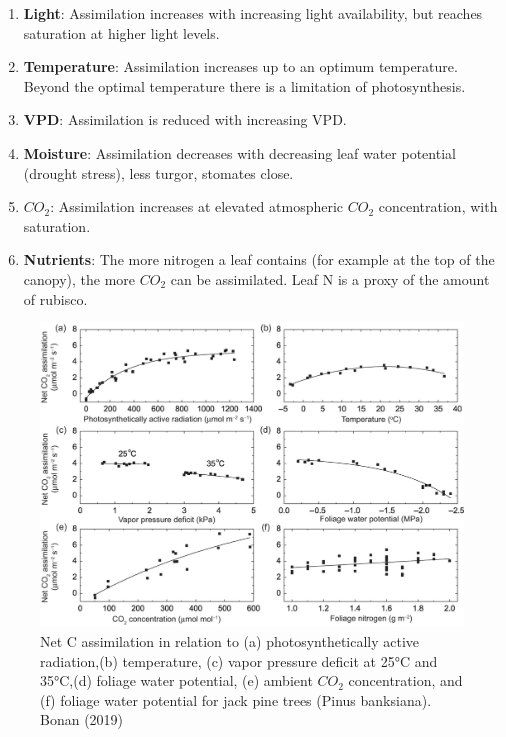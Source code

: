 \documentclass[12pt,oneside]{book}
\providecommand{\tightlist}{%
  \setlength{\itemsep}{0pt}\setlength{\parskip}{0pt}}
\begin{document}
\begin{enumerate}
\def\labelenumi{\arabic{enumi}.}
\tightlist
\item
  \textbf{Light}: Assimilation increases with increasing light
  availability, but reaches saturation at higher light levels.
\item
  \textbf{Temperature}: Assimilation increases up to an optimum
  temperature. Beyond the optimal temperature there is a limitation of
  photosynthesis.
\item
  \textbf{VPD}: Assimilation is reduced with increasing VPD.
\item
  \textbf{Moisture}: Assimilation decreases with decreasing leaf water
  potential (drought stress), less turgor, stomates close.
\item
  \textbf{\(CO_2\)}: Assimilation increases at elevated atmospheric
  \(CO_2\) concentration, with saturation.
\item
  \textbf{Nutrients}: The more nitrogen a leaf contains (for example at
  the top of the canopy), the more \(CO_2\) can be assimilated. Leaf N
  is a proxy of the amount of rubisco.
\end{enumerate}

\begin{figure}

{\centering \includegraphics[width=0.8\linewidth]{figures/chap2/photosynthesis_obs} 

}

\caption{Net C assimilation in relation to (a) photosynthetically active radiation,(b) temperature, (c) vapor pressure deficit at 25°C and 35°C,(d) foliage water potential, (e) ambient $CO_2$ concentration, and (f) foliage water potential for jack pine trees (Pinus banksiana). Bonan (2019)}\label{fig:f22}
\end{figure}
\end{document}
